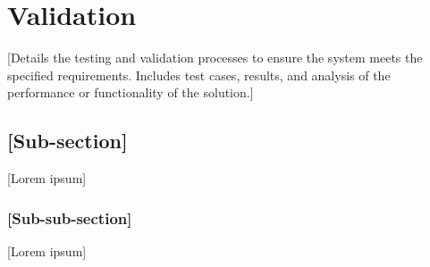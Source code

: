 \chapter{Validation}
\label{chap:validation}

[Details the testing and validation processes to ensure the system meets the specified requirements. Includes test cases, results, and analysis of the performance or functionality of the solution.]

\section{[Sub-section]}
\label{sec:validation_subsection}
[Lorem ipsum]

\subsection{[Sub-sub-section]}
\label{subsec:validation_subsubsection}
[Lorem ipsum]

